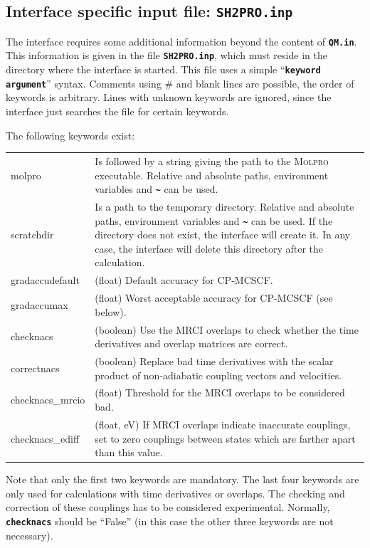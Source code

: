 \documentclass[a4paper,11pt,DIV=15,openany,twoside=false]{scrbook}
\newcommand{\ttt}[1]{\textbf{\texttt{#1}}}
\begin{document}
\subsection{Interface specific input file: \ttt{SH2PRO.inp}}

The interface requires some additional information beyond the content of \ttt{QM.in}. This information is given in the file \ttt{SH2PRO.inp}, which must reside in the directory where the interface is started. This file uses a simple ``\ttt{keyword argument}'' syntax. Comments using \# and blank lines are possible, the order of keywords is arbitrary. Lines with unknown keywords are ignored, since the interface just searches the file for certain keywords.

The following keywords exist:

\begin{tabular}{lp{9cm}}
molpro          &Is followed by a string giving the path to the \textsc{Molpro} executable. Relative and absolute paths, environment variables and \ttt{\textasciitilde} can be used.\\
scratchdir      &Is a path to the temporary directory. Relative and absolute paths, environment variables and \ttt{\textasciitilde} can be used. If the directory does not exist, the interface will create it. In any case, the interface will delete this directory after the calculation.\\
gradaccudefault &(float) Default accuracy for CP-MCSCF.\\
gradaccumax     &(float) Worst acceptable accuracy for CP-MCSCF (see below).\\
checknacs       &(boolean) Use the MRCI overlaps to check whether the time derivatives and overlap matrices are correct.\\
correctnacs     &(boolean) Replace bad time derivatives with the scalar product of non-adiabatic coupling vectors and velocities.\\
checknacs\_mrcio &(float) Threshold for the MRCI overlaps to be considered bad.\\
checknacs\_ediff &(float, eV) If MRCI overlaps indicate inaccurate couplings, set to zero couplings between states which are farther apart than this value.
\end{tabular}

Note that only the first two keywords are mandatory. The last four keywords are only used for calculations with time derivatives or overlaps. The checking and correction of these couplings has to be considered experimental. Normally, \ttt{checknacs} should be ``False'' (in this case the other three keywords are not necessary).
\end{document}
